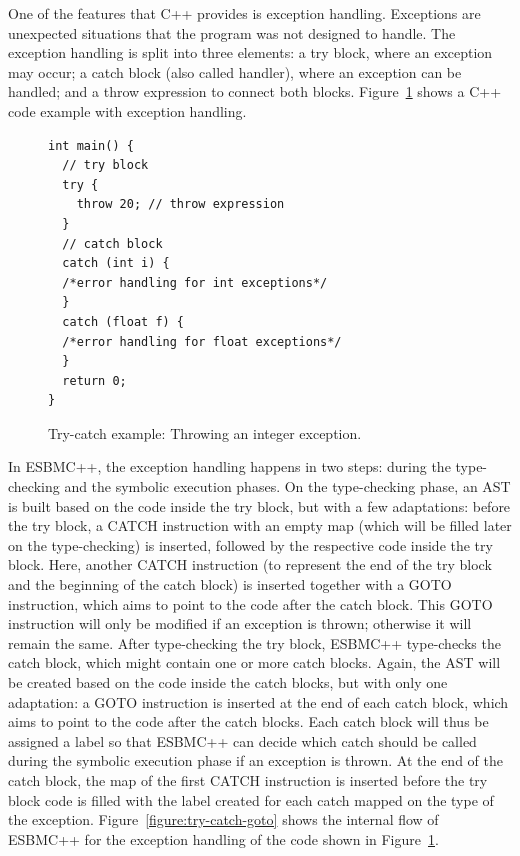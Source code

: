 \documentclass[conference]{IEEEtran}
\begin{document}
One of the features that C++ provides is exception handling.
Exceptions are unexpected situations
that the program was not designed to handle. The exception handling
is split into three elements: a try block, where an exception may occur;
a catch block (also called handler), where an exception can be handled; and a throw
expression to connect both blocks. Figure~\ref{figure:try-catch-example}
shows a C++ code example with exception handling.
%
\begin{figure}[ht]
\centering
\begin{minipage}{0.45\textwidth}
\begin{lstlisting}
int main() {
  // try block
  try {
    throw 20; // throw expression
  }
  // catch block
  catch (int i) {
  /*error handling for int exceptions*/
  }
  catch (float f) {
  /*error handling for float exceptions*/
  }
  return 0;
}
\end{lstlisting}
\end{minipage}
\caption{Try-catch example: Throwing an integer exception.}
\label{figure:try-catch-example}
\end{figure}

In ESBMC++, the exception handling happens in two steps:
during the type-checking and the symbolic execution phases.
On the type-checking phase, an AST is built based on the code
inside the try block, but with a few adaptations: before the try block,
a CATCH instruction with an empty map (which will be filled later on
the type-checking) is inserted, followed by the respective code inside
the try block. Here, another CATCH instruction (to represent the end of the
try block and the beginning of the catch block) is inserted together with
a GOTO instruction, which aims to point to the code after the catch block.
This GOTO instruction will only be modified if an exception is thrown;
otherwise it will remain the same. After type-checking the try block,
ESBMC++ type-checks the catch block, which might contain one or more catch blocks.
Again, the AST will be created based on the code inside the catch blocks, but
with only one adaptation: a GOTO instruction is inserted at the end of
each catch block, which aims to point to the code after the catch blocks. Each catch block
will thus be assigned a label so that ESBMC++ can decide which catch should be called
during the symbolic execution phase if an exception is thrown. At the end
of the catch block, the map of the first CATCH instruction is
inserted before the try block code is filled with the label created
for each catch mapped on the type of the exception. Figure~\ref{figure:try-catch-goto}
shows the internal flow of ESBMC++ for the exception handling of the code shown in
Figure~\ref{figure:try-catch-example}.
\end{document}
